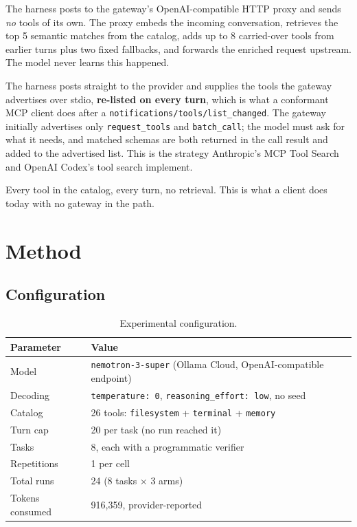 \documentclass[11pt,a4paper]{article}
\begin{document}
\begin{description}[leftmargin=1.4em, itemsep=0.45em]
  \item[Mode 1 --- semantic injection.] The harness posts to the gateway's OpenAI-compatible HTTP
  proxy and sends \emph{no} tools of its own. The proxy embeds the incoming conversation, retrieves
  the top 5 semantic matches from the catalog, adds up to 8 carried-over tools from earlier turns
  plus two fixed fallbacks, and forwards the enriched request upstream. The model never learns this
  happened.

  \item[Mode 2 --- reactive discovery.] The harness posts straight to the provider and supplies the
  tools the gateway advertises over stdio, \textbf{re-listed on every turn}, which is what a
  conformant MCP client does after a \texttt{notifications/tools/list\_changed}. The gateway
  initially advertises only \texttt{request\_tools} and \texttt{batch\_call}; the model must ask for
  what it needs, and matched schemas are both returned in the call result and added to the
  advertised list. This is the strategy Anthropic's MCP Tool Search and OpenAI Codex's tool search
  implement.

  \item[Mode 3 --- inject-all baseline.] Every tool in the catalog, every turn, no retrieval. This is
  what a client does today with no gateway in the path.
\end{description}

\section{Method}

\subsection{Configuration}

\begin{table}[h]
\centering
\small
\begin{tabular}{@{}ll@{}}
\toprule
\textbf{Parameter} & \textbf{Value} \\
\midrule
Model & \texttt{nemotron-3-super} (Ollama Cloud, OpenAI-compatible endpoint) \\
Decoding & \texttt{temperature: 0}, \texttt{reasoning\_effort: low}, no seed \\
Catalog & 26 tools: \texttt{filesystem} + \texttt{terminal} + \texttt{memory} \\
Turn cap & 20 per task (no run reached it) \\
Tasks & 8, each with a programmatic verifier \\
Repetitions & 1 per cell \\
Total runs & 24 (8 tasks $\times$ 3 arms) \\
Tokens consumed & 916{,}359, provider-reported \\
\bottomrule
\end{tabular}
\caption{Experimental configuration.}
\end{table}
\end{document}
